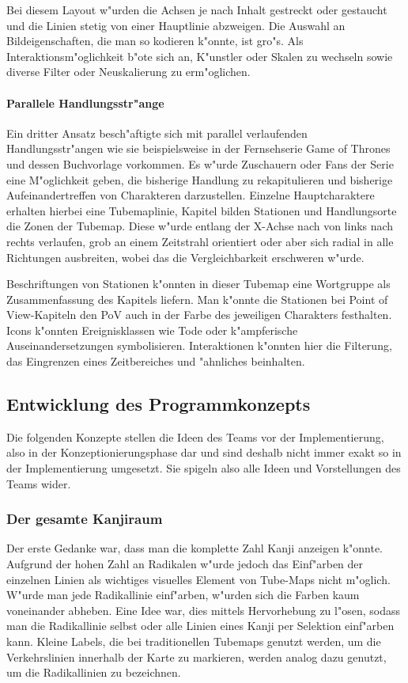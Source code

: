 Bei diesem Layout w"urden die Achsen je nach Inhalt gestreckt oder gestaucht und die Linien stetig von einer Hauptlinie abzweigen. Die Auswahl an Bildeigenschaften, die man so kodieren k"onnte, ist gro"s. Als Interaktionsm"oglichkeit b"ote sich an, K"unstler oder Skalen zu wechseln sowie diverse Filter oder Neuskalierung zu erm"oglichen. 

\paragraph{Parallele Handlungsstr"ange}
Ein dritter Ansatz besch"aftigte sich mit parallel verlaufenden Handlungsstr"angen wie sie beispielsweise in der Fernsehserie Game of Thrones und dessen Buchvorlage vorkommen. Es w"urde Zuschauern oder Fans der Serie eine M"oglichkeit geben, die bisherige Handlung zu rekapitulieren und bisherige Aufeinandertreffen von Charakteren darzustellen. Einzelne Hauptcharaktere erhalten hierbei eine Tubemaplinie, Kapitel bilden Stationen und Handlungsorte die Zonen der Tubemap. Diese w"urde entlang der X-Achse nach von links nach rechts verlaufen, grob an einem Zeitstrahl orientiert oder aber sich radial in alle Richtungen ausbreiten, wobei das die Vergleichbarkeit erschweren w"urde.

Beschriftungen von Stationen k"onnten in dieser Tubemap eine Wortgruppe als Zusammenfassung des Kapitels liefern. Man k"onnte die Stationen bei Point of View-Kapiteln den PoV auch in der Farbe des jeweiligen Charakters festhalten. Icons k"onnten Ereignisklassen wie Tode oder k"ampferische Auseinandersetzungen symbolisieren. Interaktionen k"onnten hier die Filterung, das Eingrenzen eines Zeitbereiches und "ahnliches beinhalten. 


\subsection{Entwicklung des Programmkonzepts}
Die folgenden Konzepte stellen die Ideen des Teams vor der Implementierung, also in der Konzeptionierungsphase dar und sind deshalb nicht immer exakt so in der Implementierung umgesetzt. Sie spigeln also alle Ideen und Vorstellungen des Teams wider. 
\subsubsection{Der gesamte Kanjiraum}
Der erste Gedanke war, dass man die komplette Zahl Kanji anzeigen k"onnte. Aufgrund der hohen Zahl an Radikalen w"urde jedoch das Einf"arben der einzelnen Linien als wichtiges visuelles Element von Tube-Maps nicht m"oglich. W"urde man jede Radikallinie einf"arben, w"urden sich die Farben kaum voneinander abheben. Eine Idee war, dies mittels Hervorhebung zu l"osen, sodass man die Radikallinie selbst oder alle Linien eines Kanji per Selektion einf"arben kann. Kleine Labels, die bei traditionellen Tubemaps genutzt werden, um die Verkehrslinien innerhalb der Karte zu markieren, werden analog dazu genutzt, um die Radikallinien zu bezeichnen.

